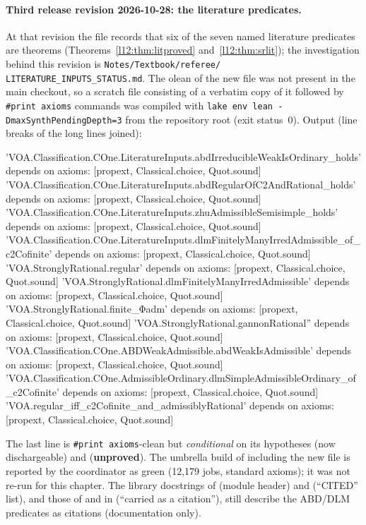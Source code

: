 \paragraph{Third release revision 2026-10-28: the literature predicates.} At that revision the file
 records that six of the seven named literature predicates are theorems (Theorems~\ref{l12:thm:litproved}
and~\ref{l12:thm:srlit}); the investigation behind this revision is \texttt{Notes/\allowbreak Textbook/\allowbreak referee/\allowbreak
LITERATURE\_INPUTS\_STATUS.md}. The olean of the new file was not present in the main checkout, so a scratch file consisting of a
verbatim copy of it followed by \texttt{\#print axioms} commands was compiled with \texttt{lake env lean -DmaxSynthPendingDepth=3}
from the repository root (exit status~0). Output (line breaks of the long lines joined):
\begin{plaincode}
'VOA.Classification.COne.LiteratureInputs.abdIrreducibleWeakIsOrdinary_holds' depends on axioms: [propext, Classical.choice, Quot.sound]
'VOA.Classification.COne.LiteratureInputs.abdRegularOfC2AndRational_holds' depends on axioms: [propext, Classical.choice, Quot.sound]
'VOA.Classification.COne.LiteratureInputs.zhuAdmissibleSemisimple_holds' depends on axioms: [propext, Classical.choice, Quot.sound]
'VOA.Classification.COne.LiteratureInputs.dlmFinitelyManyIrredAdmissible_of_c2Cofinite' depends on axioms: [propext, Classical.choice, Quot.sound]
'VOA.StronglyRational.regular' depends on axioms: [propext, Classical.choice, Quot.sound]
'VOA.StronglyRational.dlmFinitelyManyIrredAdmissible' depends on axioms: [propext, Classical.choice, Quot.sound]
'VOA.StronglyRational.finite_Φadm' depends on axioms: [propext, Classical.choice, Quot.sound]
'VOA.StronglyRational.gannonRational'' depends on axioms: [propext, Classical.choice, Quot.sound]
'VOA.Classification.COne.ABDWeakAdmissible.abdWeakIsAdmissible' depends on axioms: [propext, Classical.choice, Quot.sound]
'VOA.Classification.COne.AdmissibleOrdinary.dlmSimpleAdmissibleOrdinary_of_c2Cofinite' depends on axioms: [propext, Classical.choice, Quot.sound]
'VOA.regular_iff_c2Cofinite_and_admissiblyRational' depends on axioms: [propext, Classical.choice, Quot.sound]
\end{plaincode}
The last line is \texttt{\#print axioms}-clean but \emph{conditional} on its hypotheses  (now dischargeable) and
 (\textbf{unproved}). The umbrella build of  including the new file
is reported by the coordinator as green (12,179 jobs, standard axioms); it was not re-run for this chapter. The library
docstrings of  (module header) and  (``CITED'' list), and those of
 and  in  (``carried as a
citation''), still describe the ABD/DLM predicates as citations (documentation only).

